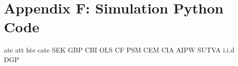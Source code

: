 %
%

\chapter{Appendix F: Simulation Python Code}
\label{app:app02}



\newpage

\ac{ate}
\ac{att}
\ac{hte}
\ac{cate}
\ac{SEK}
\ac{GBP}
\ac{CBI}
\ac{OLS}
\ac{CF}
\ac{PSM}
\ac{CEM}
\ac{CIA}
\ac{AIPW}
\ac{SUTVA}
\ac{i.i.d}
\ac{DGP}